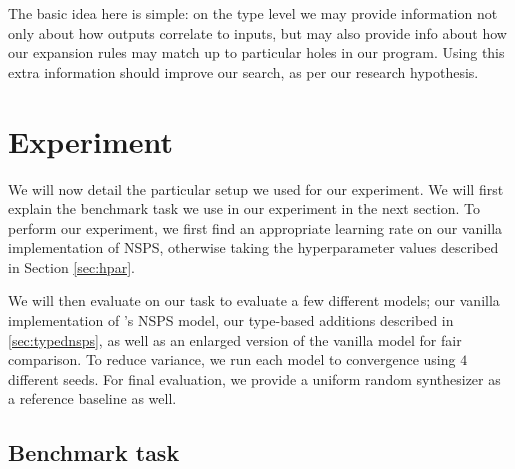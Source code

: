 \documentclass{article} %
\begin{document}
The basic idea here is simple:
on the type level we may provide information not only about how outputs correlate to inputs,
but may also provide info about how our expansion rules may match up to particular holes in our program.
Using this extra information should improve our search,
as per our research hypothesis. %


\section{Experiment} \label{sec:experiment}

We will now detail the particular setup we used for our experiment.
We will first explain the benchmark task we use in our experiment in
the next section.
To perform our experiment, we
first find an appropriate learning rate on our vanilla implementation of NSPS,
otherwise taking the hyperparameter values described in Section \ref{sec:hpar}.

We will then evaluate on our task to evaluate a few different models;
our vanilla implementation of \citet{nsps}'s NSPS model,
our type-based additions described in \ref{sec:typednsps},
as well as an enlarged version of the vanilla model for fair comparison.
To reduce variance, we run each model to convergence using $4$ different seeds.
For final evaluation, we provide a uniform random synthesizer as a reference baseline as well.

\subsection{Benchmark task} \label{sec:task}
\end{document}
